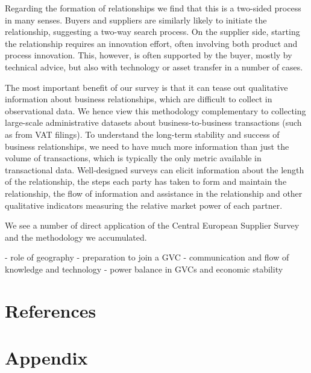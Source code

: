 \documentclass[final, dvipsnames, authoryear,12pt]{elsarticle}
\begin{document}
Regarding the formation of relationships we find that this is a two-sided process in many senses. Buyers and suppliers are similarly likely to initiate the relationship, suggesting a two-way search process. On the supplier side, starting the relationship requires an innovation effort, often involving both product and process innovation. This, however, is often supported by the buyer, mostly by technical advice, but also with technology or asset transfer in a number of cases.

The most important benefit of our survey is that it can tease out qualitative information about business relationships, which are difficult to collect in observational data. We hence view this methodology complementary to collecting large-scale administrative datasets about business-to-business transactions (such as from VAT filings). To understand the long-term stability and success of business relationships, we need to have much more information than just the volume of transactions, which is typically the only metric available in transactional data. Well-designed surveys can elicit information about the length of the relationship, the steps each party has taken to form and maintain the relationship, the flow of information and assistance in the relationship and other qualitative indicators measuring the relative market power of each partner.

We see a number of direct application of the Central European Supplier Survey and the methodology we accumulated. 

- role of geography
- preparation to join a GVC
- communication and flow of knowledge and technology
- power balance in GVCs and economic stability \cite{still_standing}

\section{References}




\appendix
\section{Appendix}
\end{document}
